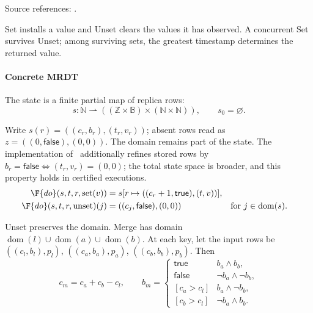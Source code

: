 \noindent Source references: \cite{neem}.







Set installs a value and Unset clears the values it has observed. A concurrent Set survives Unset; among surviving sets, the greatest timestamp determines the returned value.

\paragraph{Concrete MRDT}
The state is a finite partial map of replica rows:
\[
s:\mathbb N\rightharpoonup((\mathbb Z\times\mathbb B)\times(\mathbb N\times\mathbb N)),\qquad s_0=\varnothing.
\]

Write $s(r)=((c_r,b_r),(t_r,v_r))$; absent rows read as $z=((0,\mathsf{false}),(0,0))$. The domain remains part of the state. The implementation of~\citet{neem} additionally refines stored rows by $b_r=\mathsf{false}\iff(t_r,v_r)=(0,0)$; the total state space is broader, and this property holds in certified executions.
\[
\begin{aligned}
\F{do}(s,t,r,\mathrm{set}(v))&=s[r\mapsto((c_r+1,\mathsf{true}),(t,v))],\\
\F{do}(s,t,r,\mathrm{unset})(j)&=((c_j,\mathsf{false}),(0,0))&&\text{for }j\in\operatorname{dom}(s).
\end{aligned}
\]

Unset preserves the domain. Merge has domain $\operatorname{dom}(l)\cup\operatorname{dom}(a)\cup\operatorname{dom}(b)$. At each key, let the input rows be $((c_l,b_l),p_l)$, $((c_a,b_a),p_a)$, $((c_b,b_b),p_b)$. Then
\[
c_m=c_a+c_b-c_l,\qquad
b_m=\begin{cases}
\mathsf{true}&b_a\land b_b,\\
\mathsf{false}&\neg b_a\land\neg b_b,\\
[c_a>c_l]&b_a\land\neg b_b,\\
[c_b>c_l]&\neg b_a\land b_b.
\end{cases}
\]

